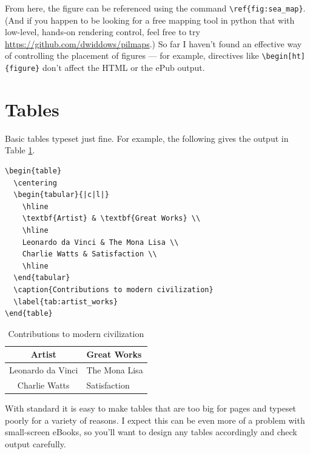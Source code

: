 From here, the figure can be referenced using the command 
\verb|\ref{fig:sea_map}|. (And if you happen to be looking for a free mapping tool in python that
with low-level, hands-on rendering control, feel free to try \url{https://github.com/dwiddows/pilmaps}.) 
So far I haven't found an effective way of controlling the placement of figures --- for example, directives
like \verb|\begin[ht]{figure}| don't affect the HTML or the ePub output.

\section{Tables}

Basic tables typeset just fine. For example, the following \latex gives the output in Table \ref{tab:artist_works}.

\begin{verbatim}
\begin{table}
  \centering
  \begin{tabular}{|c|l|}
    \hline
    \textbf{Artist} & \textbf{Great Works} \\
    \hline
    Leonardo da Vinci & The Mona Lisa \\
    Charlie Watts & Satisfaction \\
    \hline
  \end{tabular}
  \caption{Contributions to modern civilization}
  \label{tab:artist_works}
\end{table}
\end{verbatim}

\begin{table}
 \begin{center}
  \begin{tabular}{|c|l|}
    \hline
    \textbf{Artist} & \textbf{Great Works} \\
    \hline
    Leonardo da Vinci & The Mona Lisa \\
    Charlie Watts & Satisfaction \\
    \hline
  \end{tabular}
  \caption{Contributions to modern civilization}
  \label{tab:artist_works}
 \end{center}
\end{table}

With standard \latex it is easy to make tables that are too big for pages and typeset poorly for a variety of reasons.
I expect this can be even more of a problem with small-screen eBooks, so you'll want to design any tables accordingly
and check output carefully.

